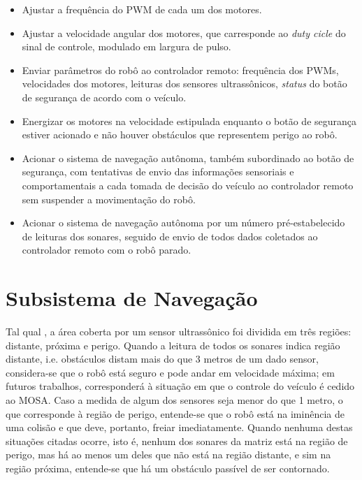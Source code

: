 \begin{itemize}
 \item 
Ajustar a frequência do PWM de cada um dos motores.
 \item 
Ajustar a velocidade angular dos motores, que carresponde ao \textit{duty cicle} do sinal de controle, modulado em largura de pulso.
 \item 
 Enviar parâmetros do robô ao controlador remoto: frequência dos PWMs, velocidades dos motores, leituras dos sensores ultrassônicos, 
\textit{status} do botão de segurança de acordo com o veículo.
 \item 
Energizar os motores na velocidade estipulada enquanto o botão de segurança estiver acionado e não houver obstáculos que representem perigo ao robô.
 \item 
Acionar o sistema de navegação autônoma, também subordinado ao botão de segurança, com tentativas de envio das informações sensoriais e 
comportamentais a cada tomada de decisão do veículo ao controlador remoto sem suspender a movimentação do robô.
 \item 
 Acionar o sistema de navegação autônoma por um número pré-estabelecido de leituras dos sonares, seguido de envio de todos dados coletados ao 
controlador remoto com o robô parado.
\end{itemize}


\section{Subsistema de Navegação}
Tal qual \cite{Artigo_3}, a área coberta por um sensor ultrassônico foi dividida em três regiões: distante, próxima e perigo.
Quando a leitura de todos os sonares indica região distante, i.e. obstáculos distam mais do que 3 metros de um dado sensor, considera-se que o robô 
está seguro e pode andar em velocidade máxima; em futuros trabalhos, corresponderá à situação em que o controle do veículo é cedido ao MOSA.
Caso a medida de algum dos sensores seja menor do que 1 metro, o que corresponde à região de perigo, entende-se que o robô está na iminência de uma 
colisão e que deve, portanto, freiar imediatamente.
Quando nenhuma destas situações citadas ocorre, isto é, nenhum dos sonares da matriz está na região de perigo, mas há ao menos um deles que não está 
na região distante, e sim na região próxima, entende-se que há um obstáculo passível de ser contornado.

